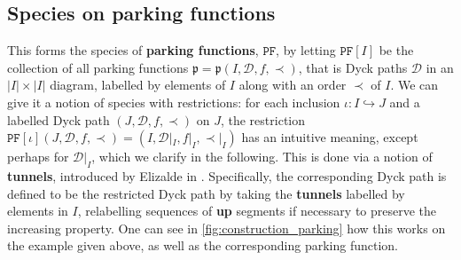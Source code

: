 \documentclass[12pt, reqno]{amsart}
\theoremstyle{definition}
\begin{document}
\subsection{Species on parking functions}

This forms the species of \textbf{parking functions}, $\mathtt{PF}$, by letting $\mathtt{PF}[I]$ be the collection of all parking functions $\mathfrak{p} = \mathfrak{p}(I, \mathcal D, f, \prec)$, that is Dyck paths $\mathcal D$ in an $|I|\times |I|$ diagram, labelled by elements of $I$ along with an order $\prec$ of $I$.
We can give it a notion of species with restrictions: for each inclusion $\iota : I \hookrightarrow J $ and a labelled Dyck path $(J, \mathcal D, f, \prec)$ on $J$, the restriction $\mathtt{PF}[\iota](J, \mathcal D, f, \prec) = (I, \mathcal D|_I, f|_I, \prec|_I)$ has an intuitive meaning, except perhaps for
$\mathcal D|_I$, which we clarify in the following.
This is done via a notion of \textbf{tunnels}, introduced by Elizalde in \cite{elizalde2003simple}.
Specifically, the corresponding Dyck path is defined to be the restricted Dyck path by taking the \textbf{tunnels} labelled by elements in $I$, relabelling sequences of \textbf{up} segments if necessary to preserve the increasing property.
One can see in \cref{fig:construction_parking} how this works on the example given above, as well as the corresponding parking function.


\begin{figure}[h]
\centering
    \qquad
    \caption{\label{fig:restriction_parking}}%
\end{figure}
\end{document}
